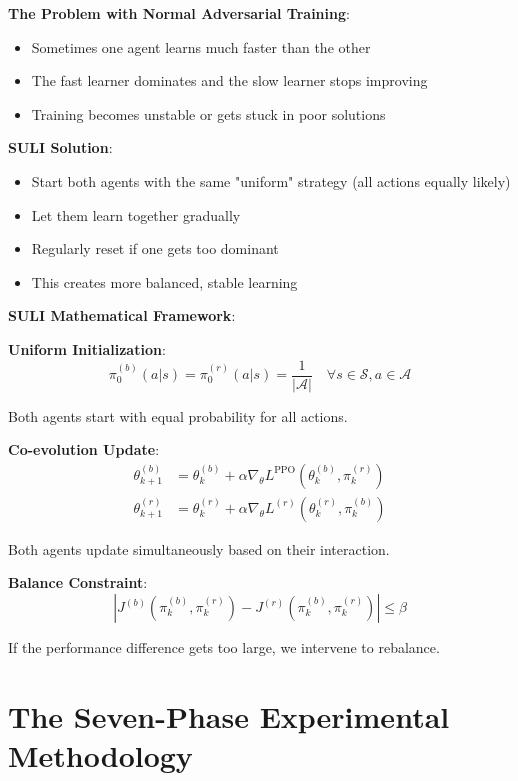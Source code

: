 \documentclass[11pt]{article}
\begin{document}
\begin{intuition}
\textbf{The Problem with Normal Adversarial Training}:
\begin{itemize}
\item Sometimes one agent learns much faster than the other
\item The fast learner dominates and the slow learner stops improving
\item Training becomes unstable or gets stuck in poor solutions
\end{itemize}

\textbf{SULI Solution}:
\begin{itemize}
\item Start both agents with the same "uniform" strategy (all actions equally likely)
\item Let them learn together gradually
\item Regularly reset if one gets too dominant
\item This creates more balanced, stable learning
\end{itemize}
\end{intuition}

\begin{mathdetails}
\textbf{SULI Mathematical Framework}:

\textbf{Uniform Initialization}:
$$\pi_0^{(b)}(a|s) = \pi_0^{(r)}(a|s) = \frac{1}{|\mathcal{A}|} \quad \forall s \in \mathcal{S}, a \in \mathcal{A}$$

Both agents start with equal probability for all actions.

\textbf{Co-evolution Update}:
\begin{align}
\theta_{k+1}^{(b)} &= \theta_k^{(b)} + \alpha \nabla_\theta L^{\text{PPO}}(\theta_k^{(b)}, \pi_k^{(r)}) \\
\theta_{k+1}^{(r)} &= \theta_k^{(r)} + \alpha \nabla_\theta L^{(r)}(\theta_k^{(r)}, \pi_k^{(b)})
\end{align}

Both agents update simultaneously based on their interaction.

\textbf{Balance Constraint}:
$$|J^{(b)}(\pi_k^{(b)}, \pi_k^{(r)}) - J^{(r)}(\pi_k^{(b)}, \pi_k^{(r)})| \leq \beta$$

If the performance difference gets too large, we intervene to rebalance.
\end{mathdetails}

\section{The Seven-Phase Experimental Methodology}
\end{document}
